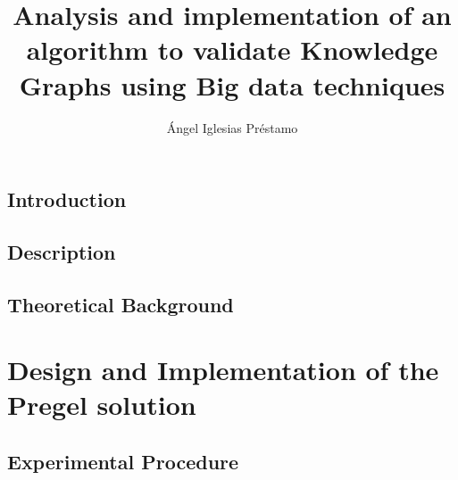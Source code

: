 \documentclass{legrand}
\begin{document}
\title{Analysis and implementation of an algorithm to validate Knowledge Graphs using Big data techniques}
\author{Ángel Iglesias Préstamo}









\setcounter{page}{0}



\tableofcontents

\listoffigures

\listoftables


\chapter{Introduction}
\setcounter{page}{0} %
\label{chapter:intro}


\chapter{Description}
\label{chapter:description}


\chapter{Theoretical Background}
\label{chapter:theory}


\part{Design and Implementation of the Pregel solution}

\chapter{Experimental Procedure}
\label{chapter:experiment}

\end{document}
